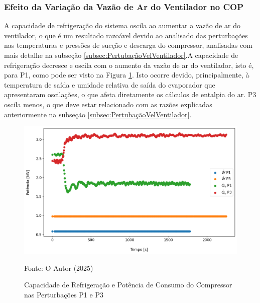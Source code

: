 \subsubsection{Efeito da Variação da Vazão de Ar do Ventilador no COP}

A capacidade de refrigeração do sistema oscila ao aumentar a vazão de ar do ventilador, o que é um resultado razoável devido ao analisado das perturbações nas temperaturas e pressões de sucção e descarga do compressor, analisadas com mais detalhe na subseção \ref{subsec:PertubaçãoVelVentilador}.A capacidade de refrigeração decresce e oscila com o aumento da vazão de ar do ventilador, isto é, para P1, como pode ser visto na Figura \ref{fig:Qe e W Perturbação Ventilador}. Isto ocorre devido, principalmente, à temperatura de saída e umidade relativa de saída do evaporador que apresentaram oscilações, o que afeta diretamente os cálculos de entalpia do ar. P3 oscila menos, o que deve estar relacionado com as razões explicadas anteriormente na subseção \ref{subsec:PertubaçãoVelVentilador}.

\begin{figure}[h]
    \centering
    \includegraphics[width=1\linewidth]{FigurasdoTexto/Qe e W Perturbação Ventilador.png}
    \caption{Capacidade de Refrigeração e Potência de Consumo do Compressor nas Perturbações P1 e P3}
    \label{fig:Qe e W Perturbação Ventilador}
    {\footnotesize Fonte: O Autor (2025)}
\end{figure}

